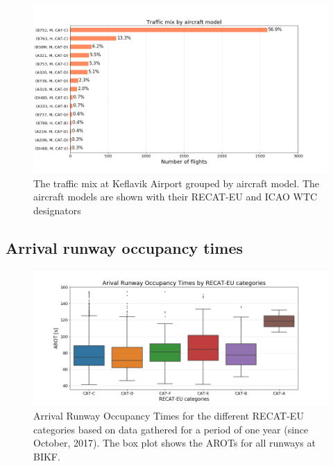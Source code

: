 \begin{figure}
    \centering
    \includegraphics[width=1\textwidth]{graphics/fig_traffic_mix_by_model.png}
    \caption[Traffic mix by aircraft model.]{The traffic mix at Keflavik Airport grouped by aircraft model. The aircraft models are shown with their RECAT-EU and ICAO WTC designators}
    \label{fig:traffic_mix_by_model}
\end{figure}

\subsection{Arrival runway occupancy times}

\begin{figure}
    \centering
    \includegraphics[width=1\textwidth]{graphics/fig_RECAT_AROTs_boxplot.png}
    \caption[AROTs boxplot for RECAT categories, all runways]{Arrival Runway Occupancy Times for the different RECAT-EU categories based on data gathered for a period of one year (since October, 2017). The box plot shows the AROTs for all runways at BIKF.}
    \label{fig:RECAT_AROTs_boxplot}
\end{figure}


